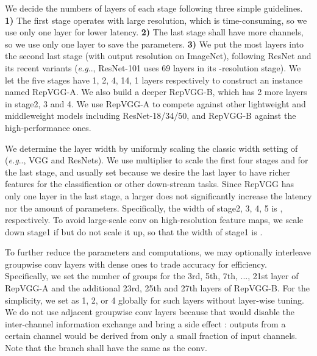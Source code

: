 \documentclass[final]{cvpr}
\makeatletter
\DeclareRobustCommand\onedot{\futurelet\@let@token\@onedot}
\def\@onedot{\ifx\@let@token.\else.\null\fi\xspace}
\def\eg{\emph{e.g}\onedot}
\makeatother
\begin{document}
We decide the numbers of layers of each stage following three simple guidelines. \textbf{1)} The first stage operates with large resolution, which is time-consuming, so we use only one layer for lower latency. \textbf{2)} The last stage shall have more channels, so we use only one layer to save the parameters. \textbf{3)} We put the most layers into the second last stage (with  output resolution on ImageNet), following ResNet and its recent variants \cite{he2016deep,regnet,xie2017aggregated} (\eg, ResNet-101 uses 69 layers in its -resolution stage). We let the five stages have 1, 2, 4, 14, 1 layers respectively to construct an instance named RepVGG-A. We also build a deeper RepVGG-B, which has 2 more layers in stage2, 3 and 4. We use RepVGG-A to compete against other lightweight and middleweight models including ResNet-18/34/50, and RepVGG-B against the high-performance ones. 

We determine the layer width by uniformly scaling the classic width setting of  (\eg, VGG and ResNets). We use multiplier  to scale the first four stages and  for the last stage, and usually set  because we desire the last layer to have richer features for the classification or other down-stream tasks. Since RepVGG has only one layer in the last stage, a larger  does not significantly increase the latency nor the amount of parameters. Specifically, the width of stage2, 3, 4, 5 is , respectively. To avoid large-scale conv on high-resolution feature maps, we scale down stage1 if  but do not scale it up, so that the width of stage1 is .

To further reduce the parameters and computations, we may optionally interleave groupwise  conv layers with dense ones to trade accuracy for efficiency. Specifically, we set the number of groups  for the 3rd, 5th, 7th, ..., 21st layer of RepVGG-A and the additional 23rd, 25th and 27th layers of RepVGG-B. For the simplicity, we set  as 1, 2, or 4 globally for such layers without layer-wise tuning. We do not use adjacent groupwise conv layers because that would disable the inter-channel information exchange and bring a side effect \cite{zhang2018shufflenet}: outputs from a certain channel would be derived from only a small fraction of input channels. Note that the  branch shall have the same  as the  conv.
\end{document}
